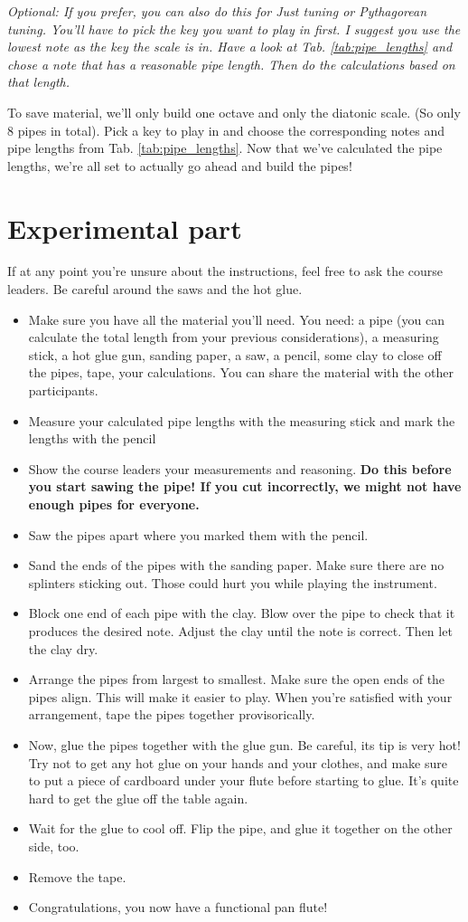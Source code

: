 \documentclass[a4paper, 11pt]{article}
\begin{document}
\textit{Optional: If you prefer, you can also do this for Just tuning or Pythagorean tuning. You'll have to pick the key you want to play in first. I suggest you use the lowest note as the key the scale is in. Have a look at Tab. \ref{tab:pipe_lengths} and chose a note that has a reasonable pipe length. Then do the calculations based on that length.}

To save material, we'll only build one octave and only the diatonic scale. (So only 8 pipes in total). Pick a key to play in and choose the corresponding notes and pipe lengths from Tab. \ref{tab:pipe_lengths}.
Now that we've calculated the pipe lengths, we're all set to actually go ahead and build the pipes! 

\section{Experimental part}
If at any point you're unsure about the instructions, feel free to ask the course leaders. Be careful around the saws and the hot glue.
\begin{itemize}
    \item Make sure you have all the material you'll need. You need: a pipe (you can calculate the total length from your previous considerations), a measuring stick, a hot glue gun, sanding paper, a saw, a pencil, some clay to close off the pipes, tape, your calculations. You can share the material with the other participants.
    \item Measure your calculated pipe lengths with the measuring stick and mark the lengths with the pencil
    \item Show the course leaders your measurements and reasoning. \textbf{Do this before you start sawing the pipe! If you cut incorrectly, we might not have enough pipes for everyone.}
    \item Saw the pipes apart where you marked them with the pencil.
    \item Sand the ends of the pipes with the sanding paper. Make sure there are no splinters sticking out. Those could hurt you while playing the instrument.
    \item Block one end of each pipe with the clay. Blow over the pipe to check that it produces the desired note. Adjust the clay until the note is correct. Then let the clay dry.
    \item Arrange the pipes from largest to smallest. Make sure the open ends of the pipes align. This will make it easier to play. When you're satisfied with your arrangement, tape the pipes together provisorically.
    \item Now, glue the pipes together with the glue gun. Be careful, its tip is very hot! Try not to get any hot glue on your hands and your clothes, and make sure to put a piece of cardboard under your flute before starting to glue. It's quite hard to get the glue off the table again.
    \item Wait for the glue to cool off. Flip the pipe, and glue it together on the other side, too.
    \item Remove the tape.
    \item Congratulations, you now have a functional pan flute!
\end{itemize}
\end{document}
